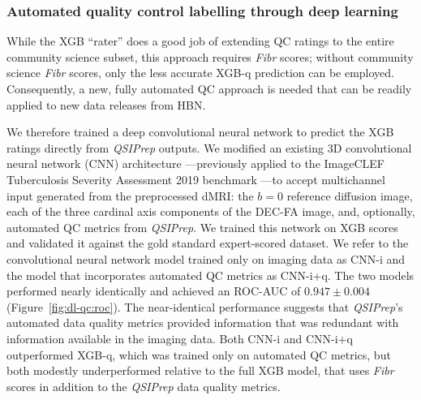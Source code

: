 \documentclass[fleqn,10pt,inline]{wlscirep}
\begin{document}
\subsubsection*{Automated quality control labelling through deep learning}

While the XGB ``rater'' does a good job of extending QC ratings to the entire
community science subset, this approach requires \emph{Fibr} scores; without community
science \emph{Fibr} scores, only the less accurate XGB-q
prediction can be employed. Consequently, a new, fully automated QC approach is needed that can be readily applied to new data releases from HBN.

We therefore trained a deep convolutional neural network to predict the XGB
ratings directly from \emph{QSIPrep} outputs. We modified an existing 3D
convolutional neural network (CNN) architecture \cite{zunair2020-bs}---previously
applied to the ImageCLEF Tuberculosis Severity Assessment 2019 benchmark
\cite{dicente2019clef}---to accept multichannel input generated from the
preprocessed dMRI: the $b=0$ reference diffusion image, each of the three
cardinal axis components of the DEC-FA image, and, optionally, automated QC
metrics from \emph{QSIPrep}. We trained this network on XGB scores and validated it
against the gold standard expert-scored dataset. We refer to the convolutional
neural network model trained only on imaging data as CNN-i and the model that
incorporates automated QC metrics as CNN-i+q. The two models performed nearly
identically and achieved an ROC-AUC of $0.947 \pm 0.004$ (Figure~\ref{fig:dl-qc:roc}). The
near-identical performance suggests that \emph{QSIPrep}'s automated data quality metrics
provided information that was redundant with information available in the imaging
data. Both CNN-i and CNN-i+q outperformed XGB-q, which was trained only on
automated QC metrics, but both modestly underperformed relative to the full XGB model,
that uses \emph{Fibr} scores in addition to the \emph{QSIPrep} data quality metrics.
\end{document}
